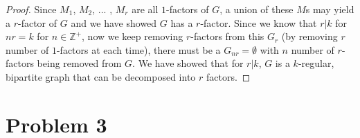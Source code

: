 \documentclass[11pt]{article}
\begin{document}
\begin{proof}
Since $M_1$, $M_2$, ... , $M_r$ are all $1$-factors of $G$, a union of these $M$s may yield a $r$-factor of $G$ and we have showed $G$ has a $r$-factor. Since we know that $r | k$ for $nr = k$ for $n \in \mathbb{Z}^+$, now we keep removing $r$-factors from this $G_r$ (by removing $r$ number of $1$-factors at each time), there must be a $G_{nr} = \emptyset$ with $n$ number of $r$-factors being removed from $G$. We have showed that for $r | k$, $G$ is a $k$-regular, bipartite graph that can be decomposed into $r$ factors.

\end{proof}






\section{Problem 3}




%
% 
% 
\end{document}
